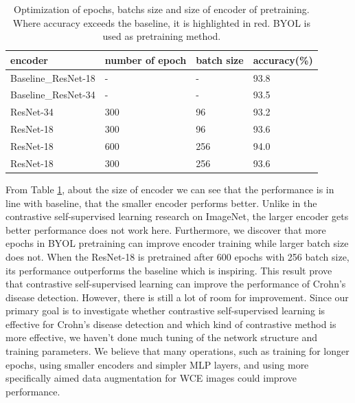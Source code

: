\documentclass[conference]{IEEEtran}
\begin{document}
\begin{table}[t]
\centering
\caption{Optimization of epochs, batchs size and size of encoder of pretraining. Where accuracy exceeds the baseline, it is highlighted in red. BYOL is used as pretraining method.}
\begin{tabular}{l|l|l|l}
\hline
encoder             & number of epoch & batch size & accuracy(\%)           \\ \hline
Baseline\_ResNet-18 & -               & -          & 93.8                        \\
Baseline\_ResNet-34 & -               & -          & 93.5                        \\ \hline
ResNet-34           & 300             & 96         & 93.2                        \\
ResNet-18           & 300             & 96         & 93.6                        \\
ResNet-18           & 600             & 256        & {\color[HTML]{FE0000} 94.0} \\
ResNet-18           & 300             & 256        & 93.6                    \\ \hline
\end{tabular}
\label{tab: optimization of epoch,batchsize, size of encoder}
\end{table}

From Table \ref{tab: optimization of epoch,batchsize, size of encoder}, about the size of encoder we can see that the performance is in line with baseline, that the smaller encoder performs better. Unlike in the contrastive self-supervised learning research on ImageNet, the larger encoder gets better performance does not work here. 
Furthermore, we discover that more epochs in BYOL pretraining can improve encoder training while larger batch size does not. When the ResNet-18 is pretrained after 600 epochs with 256 batch size, its performance outperforms the baseline which is inspiring. This result prove that contrastive self-supervised learning can improve the performance of Crohn's disease detection. However, there is still a lot of room for improvement. Since our primary goal is to investigate whether contrastive self-supervised learning is effective for Crohn's disease detection and which kind of contrastive method is more effective, we haven't done much tuning of the network structure and training parameters. We believe that many operations, such as training for longer epochs, using smaller encoders and simpler MLP layers, and using more specifically aimed data augmentation for WCE images could improve performance.
\end{document}
